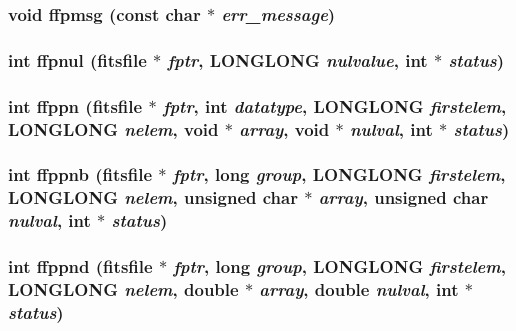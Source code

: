 \subsubsection{\setlength{\rightskip}{0pt plus 5cm}void ffpmsg (const char $\ast$ {\em err\_\-message})}\label{src_2fitsio_8h_9db26b27c3c6d7589c44565df739c3d5}


\subsubsection{\setlength{\rightskip}{0pt plus 5cm}int ffpnul (\bf{fitsfile} $\ast$ {\em fptr}, \bf{LONGLONG} {\em nulvalue}, int $\ast$ {\em status})}\label{src_2fitsio_8h_611f557254bffac18cb113388849944a}


\subsubsection{\setlength{\rightskip}{0pt plus 5cm}int ffppn (\bf{fitsfile} $\ast$ {\em fptr}, int {\em datatype}, \bf{LONGLONG} {\em firstelem}, \bf{LONGLONG} {\em nelem}, void $\ast$ {\em array}, void $\ast$ {\em nulval}, int $\ast$ {\em status})}\label{src_2fitsio_8h_03027451cf6719b0ff4ffb8c6659b2a2}


\subsubsection{\setlength{\rightskip}{0pt plus 5cm}int ffppnb (\bf{fitsfile} $\ast$ {\em fptr}, long {\em group}, \bf{LONGLONG} {\em firstelem}, \bf{LONGLONG} {\em nelem}, unsigned char $\ast$ {\em array}, unsigned char {\em nulval}, int $\ast$ {\em status})}\label{src_2fitsio_8h_38152248c04b8b4ff9f813cd636013a4}


\subsubsection{\setlength{\rightskip}{0pt plus 5cm}int ffppnd (\bf{fitsfile} $\ast$ {\em fptr}, long {\em group}, \bf{LONGLONG} {\em firstelem}, \bf{LONGLONG} {\em nelem}, double $\ast$ {\em array}, double {\em nulval}, int $\ast$ {\em status})}\label{src_2fitsio_8h_dbce44e4863160818dafc8a7e74df364}


